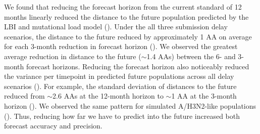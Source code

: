 \documentclass[9pt,lineno]{elife}
\begin{document}
We found that reducing the forecast horizon from the current standard of 12 months linearly reduced the distance to the future population predicted by the LBI and mutational load model ().
Under the all three submission delay scenarios, the distance to the future reduced by approximately 1 AA on average for each 3-month reduction in forecast horizon ().
We observed the greatest average reduction in distance to the future ($\sim$1.4 AAs) between the 6- and 3-month forecast horizons.
Reducing the forecast horizon also noticeably reduced the variance per timepoint in predicted future populations across all delay scenarios ().
For example, the standard deviation of distances to the future reduced from $\sim$2.6 AAs at the 12-month horizon to $\sim$1 AA at the 3-month horizon ().
We observed the same pattern for simulated A/H3N2-like populations ().
Thus, reducing how far we have to predict into the future increased both forecast accuracy and precision.
\end{document}
